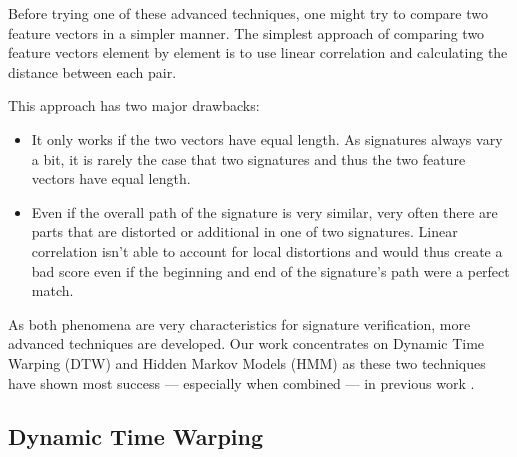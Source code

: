 \documentclass[a4paper, oneside]{csthesis}
\begin{document}
Before trying one of these advanced techniques, one might try to compare two feature vectors in a simpler manner.
The simplest approach of comparing two feature vectors element by element is to use linear correlation \cite{Plamondon1989107} and calculating the distance between each pair.

This approach has two major drawbacks:
\begin{itemize}
\item It only works if the two vectors have equal length. As signatures always vary a bit, it is rarely the case that two signatures and thus the two feature vectors have equal length.
\item Even if the overall path of the signature is very similar, very often there are parts that are distorted or additional in one of two signatures. Linear correlation isn't able to account for local distortions and would thus create a bad score even if the beginning and end of the signature's path were a perfect match.
\end{itemize}

As both phenomena are very characteristics for signature verification, more advanced techniques are developed. Our work concentrates on Dynamic Time Warping (DTW) and Hidden Markov Models (HMM) as these two techniques have shown most success --- especially when combined --- in previous work \cite{fierrez2005line, citeulike:885135, kashi1998hidden, PiyushShanker:2007:OSV:1274199.1274423,martens1996line}.


\subsection{Dynamic Time Warping}
\end{document}
